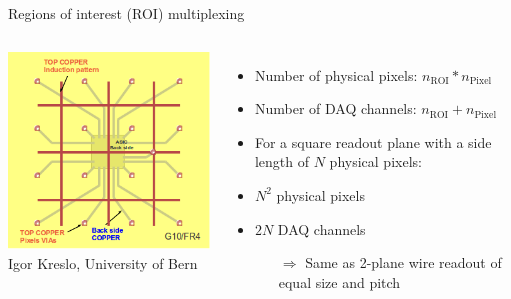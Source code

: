 \documentclass[]{beamer}
\newcommand*{\m}{\mathrm}
\newcommand*{\emphcol}{red}
\begin{document}
\begin{frame}{Regions of interest (ROI) multiplexing}
	\begin{columns}[c]
		\centering
		\includegraphics[width=\textwidth]{defence/roi}\\
		{\tiny Igor Kreslo, University of Bern}\\
		\begin{itemize}
			\item Number of physical pixels: {\color{\emphcol} $n_{\m{ROI}} * n_{\m{Pixel}}$}
			\item Number of DAQ channels: {\color{\emphcol} $n_{\m{ROI}} + n_{\m{Pixel}}$}
			\item For a square readout plane with a side length of $N$ physical pixels:
			\item $N ^ 2$ physical pixels
			\item $2 N$ DAQ channels
			\begin{itemize}
				\item[$\Rightarrow$] Same as 2-plane wire readout of equal size and pitch
			\end{itemize}
		\end{itemize}
	\end{columns}
\end{frame}
\end{document}
